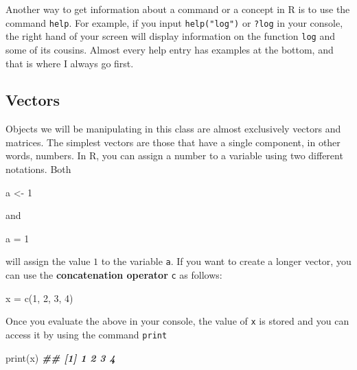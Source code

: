 \documentclass[
]{book}
\newenvironment{Shaded}{\begin{snugshade}}{\end{snugshade}}
\newcommand{\DecValTok}[1]{\textcolor[rgb]{0.00,0.00,0.81}{#1}}
\newcommand{\DocumentationTok}[1]{\textcolor[rgb]{0.56,0.35,0.01}{\textbf{\textit{#1}}}}
\newcommand{\FunctionTok}[1]{\textcolor[rgb]{0.00,0.00,0.00}{#1}}
\newcommand{\NormalTok}[1]{#1}
\newcommand{\OtherTok}[1]{\textcolor[rgb]{0.56,0.35,0.01}{#1}}
\theoremstyle{definition}
\theoremstyle{definition}
\theoremstyle{definition}
\theoremstyle{definition}
\theoremstyle{remark}
\begin{document}
Another way to get information about a command or a concept in R is to use the command \texttt{help}. For example, if you input \texttt{help("log")} or \texttt{?log} in your console, the right hand of your screen will display information on the function \texttt{log} and some of its cousins. Almost every help entry has examples at the bottom, and that is where I always go first.

\hypertarget{vectors}{%
\subsection{Vectors}\label{vectors}}

Objects we will be manipulating in this class are almost exclusively vectors and matrices. The simplest vectors are those that have a single component, in other words, numbers. In R, you can assign a number to a variable using two different notations. Both

\begin{Shaded}
\begin{Highlighting}[]
\NormalTok{a }\OtherTok{\textless{}{-}} \DecValTok{1}
\end{Highlighting}
\end{Shaded}

and

\begin{Shaded}
\begin{Highlighting}[]
\NormalTok{a }\OtherTok{=} \DecValTok{1}
\end{Highlighting}
\end{Shaded}

will assign the value \(1\) to the variable \texttt{a}. If you want to create a longer vector, you can use the \textbf{concatenation operator} \texttt{c} as follows:

\begin{Shaded}
\begin{Highlighting}[]
\NormalTok{x }\OtherTok{=} \FunctionTok{c}\NormalTok{(}\DecValTok{1}\NormalTok{, }\DecValTok{2}\NormalTok{, }\DecValTok{3}\NormalTok{, }\DecValTok{4}\NormalTok{)}
\end{Highlighting}
\end{Shaded}

Once you evaluate the above in your console, the value of \texttt{x} is stored and you can access it by using the command \texttt{print}

\begin{Shaded}
\begin{Highlighting}[]
\FunctionTok{print}\NormalTok{(x)}
\DocumentationTok{\#\# [1] 1 2 3 4}
\end{Highlighting}
\end{Shaded}
\end{document}
